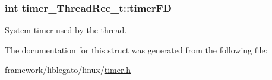 \subsubsection[{\texorpdfstring{timer\+FD}{timerFD}}]{\setlength{\rightskip}{0pt plus 5cm}int timer\+\_\+\+Thread\+Rec\+\_\+t\+::timer\+FD}\hypertarget{structtimer___thread_rec__t_a36125958610bb1854a7a4d215a5fa502}{}\label{structtimer___thread_rec__t_a36125958610bb1854a7a4d215a5fa502}


System timer used by the thread. 



The documentation for this struct was generated from the following file\+:\begin{DoxyCompactItemize}
\item 
framework/liblegato/linux/\hyperlink{timer_8h}{timer.\+h}\end{DoxyCompactItemize}
